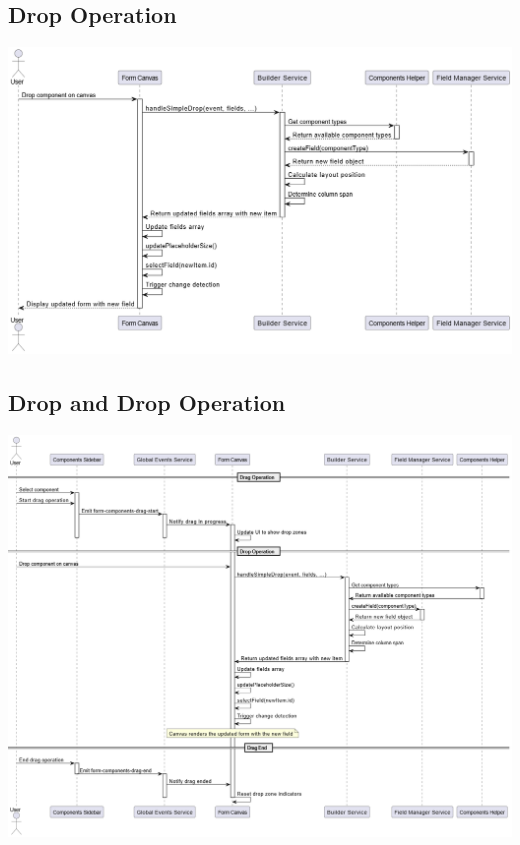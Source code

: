 \documentclass[a4paper,11pt]{article}
\begin{document}
\subsection{ Drop Operation}
\includegraphics[width=1.1\textwidth]{drop.drawio}
\newpage

\subsection{ Drop and Drop Operation}
\includegraphics[width=1.1\textwidth]{DragAndDrop.drawio}
\newpage

\newpage
\end{document}

